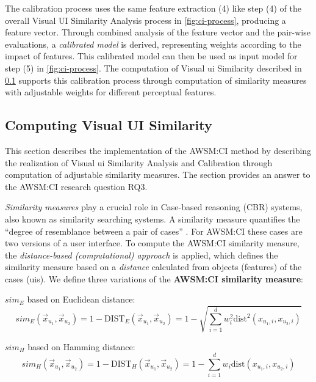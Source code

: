 The calibration process uses the same feature extraction (4) like step (4) of the overall Visual UI Similarity Analysis process in \cref{fig:ci-process}, producing a feature vector.
Through combined analysis of the feature vector and the pair-wise evaluations, a \emph{calibrated model} is derived, representing weights according to the impact of features.
This calibrated model can then be used as input model for step (5) in \cref{fig:ci-process}.
The computation of Visual \gls{ui} Similarity described in  \cref{sec:computing-sim} supports this calibration process  through computation of similarity measures with adjustable weights for different perceptual features.

\vspace{-25pt}
\hypertarget{sec:computing-sim}{%
\subsection{Computing Visual UI Similarity}\label{sec:computing-sim}}
\vspace{10pt}

This section describes the implementation of the AWSM:CI method by describing the realization of Visual \gls{ui} Similarity Analysis and Calibration through computation of adjustable similarity measures.
The section provides an answer to the AWSM:CI research question RQ3.

\emph{Similarity measures} play a crucial role in Case-based reasoning (CBR) systems, also known as similarity searching systems.
A similarity measure quantifies the ``degree of resemblance between a pair of cases'' \autocite{Liao1998}.
For AWSM:CI these cases are two versions of a user interface.
To compute the AWSM:CI similarity measure, the \emph{distance-based (computational) approach} is applied, which defines the similarity measure based on a \emph{distance} calculated from objects (features) of the cases (\glspl{ui}).
We define three variations of the \textbf{AWSM:CI similarity measure}: 

\(sim_E\) based on Euclidean distance:
\vspace{-5pt}
\begin{equation}sim_E(\vec x_{u_1}, \vec x_{u_2}) = 1- \text{DIST}_E(\vec x_{u_1}, \vec x_{u_2}) = 1 - \sqrt{\sum\limits_{i=1}^{d} w_i^2 \text{dist}^2(x_{u_1,i}, x_{u_2,i})} \label{eq:sim_e}\end{equation}

\vspace{-10pt}
\(sim_H\) based on Hamming distance:
\vspace{-5pt}
\begin{equation}sim_H(\vec x_{u_1}, \vec x_{u_2}) = 1- \text{DIST}_H(\vec x_{u_1}, \vec x_{u_2}) = 1 - \sum\limits_{i=1}^{d} w_i \text{dist}(x_{u_1,i}, x_{u_2,i})\label{eq:sim_h}\end{equation}

